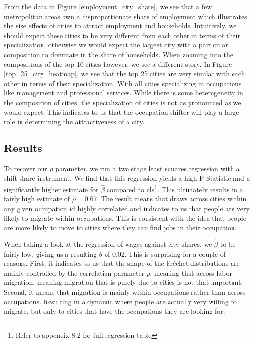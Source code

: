 \documentclass[10pt]{article}
\begin{document}
From the data in Figure \ref{employment_city_share}, we see that a few metropolitan areas own a disproportionate share of employment which illustrates the size effects of cities to attract employment and households. Intuitively, we should expect these cities to be very different from each other in terms of their specialization, otherwise we would expect the largest city with a particular composition to dominate in the share of households. When zooming into the compositions of the top 10 cities however, we see a different story. In Figure \ref{top_25_city_heatmap}, we see that the top 25 cities are very similar with each other in terms of their specialization. With all cities specializing in occupations like management and professional services. While there is some heterogeneity in the composition of cities, the specialization of cities is not as pronounced as we would expect. This indicates to us that the occupation shifter will play a large role in determining the attractiveness of a city.

\subsection{Results}

To recover our $\rho$ parameter, we run a two stage least squares regression with a shift share instrument. We find that this regression yields a high F-Statistic and a significantly higher estimate for $\hat{\beta}$ compared to ols\footnote{Refer to appendix 8.2 for full regression table}. This ultimately results in a fairly high estimate of $\hat{\rho} = 0.67$. The result means that draws across cities within any given occupation id highly correlated and indicates to us that people are very likely to migrate within occupations. This is consistent with the idea that people are more likely to move to cities where they can find jobs in their occupation.

When taking a look at the regression of wages against city shares, we $\hat{\beta}$ to be fairly low, giving us a resulting $\theta$ of 0.02. This is surprising for a couple of reasons. First, it indicates to us that the shape of the Fr\'{e}chet distributions are mainly controlled by the correlation parameter $\rho$, meaning that across labor migration, meaning migration that is purely due to cities is not that important. Second, it means that migration is mainly within occupations rather than across occupations. Resulting in a dynamic where people are actually very willing to migrate, but only to cities that have the occupations they are looking for.
\end{document}
